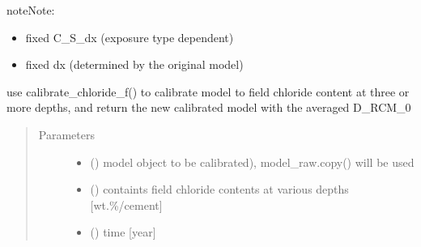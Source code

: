 \documentclass[letterpaper,10pt,english]{sphinxmanual}
\begin{document}
\begin{fulllineitems}
\begin{sphinxadmonition}{note}{Note:}
\begin{itemize}
\item {} 
\sphinxAtStartPar
fixed C\_S\_dx (exposure type dependent)

\item {} 
\sphinxAtStartPar
fixed dx (determined by the original model)

\end{itemize}
\end{sphinxadmonition}

\end{fulllineitems}


\begin{fulllineitems}
\label{\detokenize{chloride:chloride.calibrate_chloride_f_group}}
\sphinxAtStartPar
use calibrate\_chloride\_f() to calibrate model to field chloride content at three or more depths, and return the new calibrated model with the averaged D\_RCM\_0
\begin{quote}\begin{description}
\item[{Parameters}] \leavevmode\begin{itemize}
\item {} 
\sphinxAtStartPar
{} () \textendash{} model object to be calibrated), model\_raw.copy() will be used

\item {} 
\sphinxAtStartPar
{} () \textendash{} containts field chloride contents at various depths {[}wt.\sphinxhyphen{}\%/cement{]}

\item {} 
\sphinxAtStartPar
{} () \textendash{} time {[}year{]}


\end{itemize}
\end{description}
\end{quote}
\end{fulllineitems}
\end{document}
